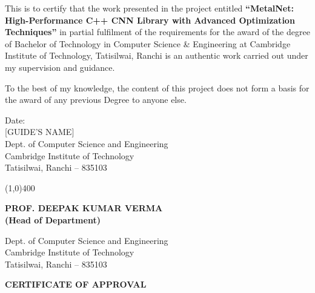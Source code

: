 \documentclass[12pt,oneside,a4paper]{report}
\begin{document}
This is to certify that the work presented in the project entitled \textbf{``MetalNet: High-Performance C++ CNN Library with Advanced Optimization Techniques''} in partial fulfilment of the requirements for the award of the degree of Bachelor of Technology in Computer Science \& Engineering at Cambridge Institute of Technology, Tatisilwai, Ranchi is an authentic work carried out under my supervision and guidance.

\vspace{2cm}

To the best of my knowledge, the content of this project does not form a basis for the award of any previous Degree to anyone else.

\vspace{3.5cm}

Date: \underline{\hspace{3cm}} \hfill \underline{\hspace{3.5cm}}\\
\vspace{0.2cm}
\phantom{Date: } \hfill [GUIDE'S NAME]\\
\vspace{0.1cm}
\phantom{Date: } \hfill Dept. of Computer Science and Engineering\\
\phantom{Date: } \hfill Cambridge Institute of Technology\\
\phantom{Date: } \hfill Tatisilwai, Ranchi -- 835103

\vspace{2.5cm}

\begin{center}
\line(1,0){400}
\end{center}

\vspace{2.5cm}

\begin{center}
\textbf{\large PROF. DEEPAK KUMAR VERMA}\\
\textbf{(Head of Department)}

\vspace{0.5cm}

Dept. of Computer Science and Engineering\\
Cambridge Institute of Technology\\
Tatisilwai, Ranchi -- 835103
\end{center}

\newpage

\thispagestyle{empty}
\vspace*{2cm}
\begin{center}
    \textbf{\Large CERTIFICATE OF APPROVAL}
\end{center}
\end{document}
